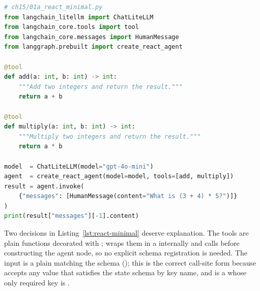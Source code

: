 \begin{lstlisting}[language=Python,
  caption={Minimal \texttt{create\_react\_agent} with two arithmetic tools},
  label={lst:react-minimal}]
# ch15/01a_react_minimal.py
from langchain_litellm import ChatLiteLLM
from langchain_core.tools import tool
from langchain_core.messages import HumanMessage
from langgraph.prebuilt import create_react_agent

@tool
def add(a: int, b: int) -> int:
    """Add two integers and return the result."""
    return a + b

@tool
def multiply(a: int, b: int) -> int:
    """Multiply two integers and return the result."""
    return a * b

model  = ChatLiteLLM(model="gpt-4o-mini")
agent  = create_react_agent(model=model, tools=[add, multiply])
result = agent.invoke(
    {"messages": [HumanMessage(content="What is (3 + 4) * 5?")]}
)
print(result["messages"][-1].content)
\end{lstlisting}

Two decisions in Listing~\ref{lst:react-minimal} deserve explanation.
The tools are plain functions decorated with ; 
wraps them in a  internally and calls
 before constructing the agent node,
so no explicit schema registration is needed. The input is a plain 
matching the  schema (); this
is the correct call-site form because  accepts any value that
satisfies the state schema by key name, and  is a
 whose only required key is .

